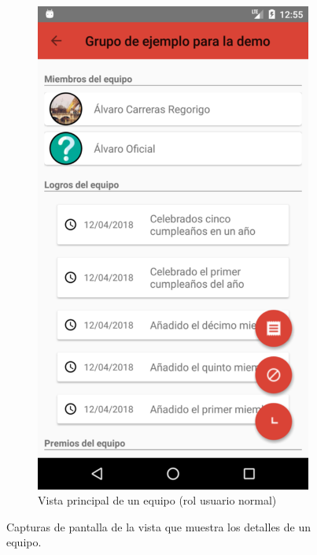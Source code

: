 \documentclass[twoside]{report}
\begin{document}
\begin{figure}[H]
\begin{center}
\begin{subfigure}[t]{.3\linewidth}
		\includegraphics[scale=0.2]{images/userguide/16.png}
		\caption{Vista principal de un equipo (rol usuario normal)}
	\end{subfigure}\hspace{2mm}%
\caption{Capturas de pantalla de la vista que muestra los detalles de un equipo.}
\end{center}
\end{figure}
\end{document}
